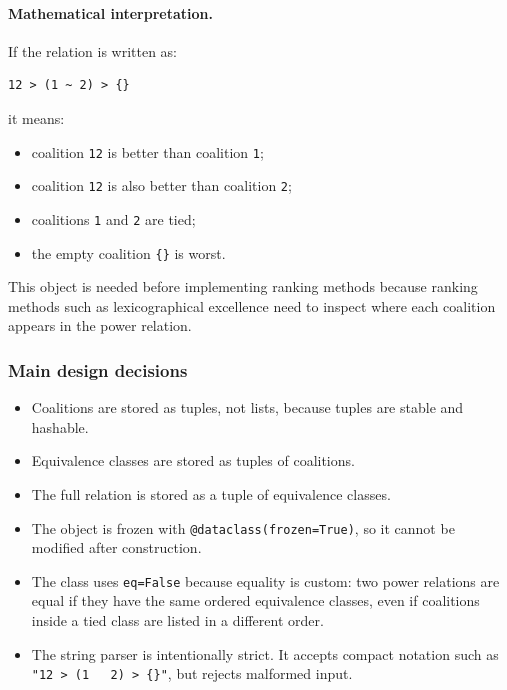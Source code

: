\documentclass[11pt]{article}
\begin{document}
\paragraph{Mathematical interpretation.}
If the relation is written as:

\begin{verbatim}
12 > (1 ~ 2) > {}
\end{verbatim}

\noindent it means:

\begin{itemize}
  \item coalition \texttt{12} is better than coalition \texttt{1};
  \item coalition \texttt{12} is also better than coalition \texttt{2};
  \item coalitions \texttt{1} and \texttt{2} are tied;
  \item the empty coalition \texttt{\{\}} is worst.
\end{itemize}

\noindent This object is needed before implementing ranking methods because
ranking methods such as lexicographical excellence need to inspect where each
coalition appears in the power relation.

\subsubsection*{Main design decisions}

\begin{itemize}
  \item Coalitions are stored as tuples, not lists, because tuples are stable
  and hashable.
  \item Equivalence classes are stored as tuples of coalitions.
  \item The full relation is stored as a tuple of equivalence classes.
  \item The object is frozen with \texttt{@dataclass(frozen=True)}, so it
  cannot be modified after construction.
  \item The class uses \texttt{eq=False} because equality is custom: two power
  relations are equal if they have the same ordered equivalence classes, even
  if coalitions inside a tied class are listed in a different order.
  \item The string parser is intentionally strict. It accepts compact notation
  such as \texttt{"12 > (1 \string~ 2) > \{\}"}, but rejects malformed input.
\end{itemize}
\end{document}
